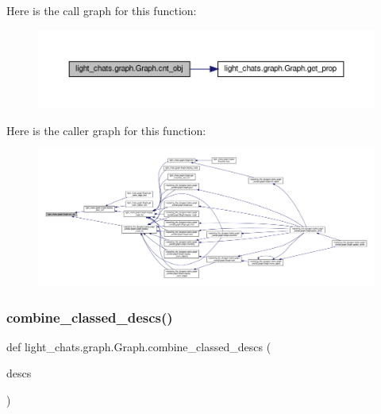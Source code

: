 Here is the call graph for this function\+:
\nopagebreak
\begin{figure}[H]
\begin{center}
\leavevmode
\includegraphics[width=350pt]{classlight__chats_1_1graph_1_1Graph_ae416efe86bf6117aec6dc1de481d0ec1_cgraph}
\end{center}
\end{figure}
Here is the caller graph for this function\+:
\nopagebreak
\begin{figure}[H]
\begin{center}
\leavevmode
\includegraphics[width=350pt]{classlight__chats_1_1graph_1_1Graph_ae416efe86bf6117aec6dc1de481d0ec1_icgraph}
\end{center}
\end{figure}
\mbox{\label{classlight__chats_1_1graph_1_1Graph_a96afb6e22927414bb55693609a5e89cb}} 
\subsubsection{\texorpdfstring{combine\+\_\+classed\+\_\+descs()}{combine\_classed\_descs()}}
{\footnotesize\ttfamily def light\+\_\+chats.\+graph.\+Graph.\+combine\+\_\+classed\+\_\+descs (\begin{DoxyParamCaption}\item[{}]{descs }\end{DoxyParamCaption})}



